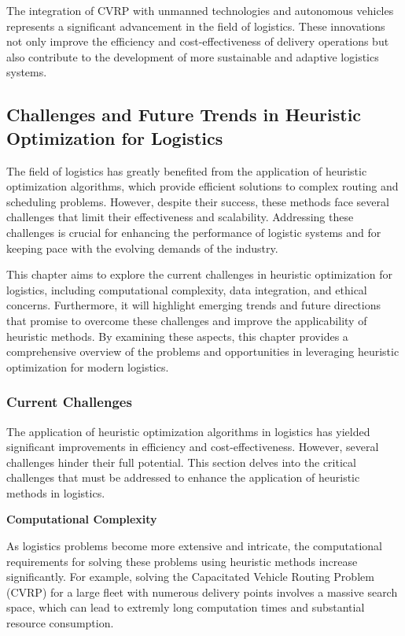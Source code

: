 \documentclass{article}
\begin{document}
    The integration of CVRP with unmanned technologies and autonomous vehicles represents a significant advancement in the field of logistics. These innovations not only improve the efficiency and cost-effectiveness of delivery operations but also contribute to the development of more sustainable and adaptive logistics systems.

    \newpage

    \subsection{Challenges and Future Trends in Heuristic Optimization for Logistics}\label{sec:challenges-and-future-trends-in-heuristic-optimization-for-logistics}

    The field of logistics has greatly benefited from the application of heuristic optimization algorithms, which provide efficient solutions to complex routing and scheduling problems. However, despite their success, these methods face several challenges that limit their effectiveness and scalability. Addressing these challenges is crucial for enhancing the performance of logistic systems and for keeping pace with the evolving demands of the industry.

    This chapter aims to explore the current challenges in heuristic optimization for logistics, including computational complexity, data integration, and ethical concerns. Furthermore, it will highlight emerging trends and future directions that promise to overcome these challenges and improve the applicability of heuristic methods. By examining these aspects, this chapter provides a comprehensive overview of the problems and opportunities in leveraging heuristic optimization for modern logistics.

    \subsubsection{Current Challenges}\label{subsec:current-challenges}

    The application of heuristic optimization algorithms in logistics has yielded significant improvements in efficiency and cost-effectiveness. However, several challenges hinder their full potential. This section delves into the critical challenges that must be addressed to enhance the application of heuristic methods in logistics.

    \textbf{Computational Complexity}

    As logistics problems become more extensive and intricate, the computational requirements for solving these problems using heuristic methods increase significantly. For example, solving the Capacitated Vehicle Routing Problem (CVRP) for a large fleet with numerous delivery points involves a massive search space, which can lead to extremly long computation times and substantial resource consumption. \cite{Puri2023}
\end{document}

